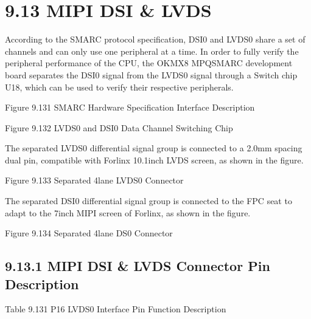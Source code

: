 \documentclass[letterpaper,10pt,openany,english]{sphinxmanual}
\begin{document}
\section{9.13 MIPI DSI \& LVDS}
\label{\detokenize{hardware:mipi-dsi-lvds}}
\sphinxAtStartPar
According to the SMARC protocol specification, DSI0 and LVDS0 share a set of channels and can only use one peripheral at a time. In order to fully verify the peripheral performance of the CPU, the OK\sphinxhyphen{}MX8 MPQ\sphinxhyphen{}SMARC development board separates the DSI0 signal from the LVDS0 signal through a Switch chip U18, which can be used to verify their respective peripherals.

\sphinxAtStartPar
{}

\sphinxAtStartPar
{}

\sphinxAtStartPar
Figure 9.13\sphinxhyphen{}1 SMARC Hardware Specification Interface Description

\sphinxAtStartPar
{}

\sphinxAtStartPar
Figure 9.13\sphinxhyphen{}2 LVDS0 and DSI0 Data Channel Switching Chip

\sphinxAtStartPar
The separated LVDS0 differential signal group is connected to a 2.0mm spacing dual pin, compatible with Forlinx 10.1\sphinxhyphen{}inch LVDS screen, as shown in the figure.

\sphinxAtStartPar
{}

\sphinxAtStartPar
Figure 9.13\sphinxhyphen{}3 Separated 4\sphinxhyphen{}lane LVDS0 Connector

\sphinxAtStartPar
The separated DSI0 differential signal group is connected to the FPC seat to adapt to the 7\sphinxhyphen{}inch MIPI screen of Forlinx, as shown in the figure.

\sphinxAtStartPar
{}

\sphinxAtStartPar
Figure 9.13\sphinxhyphen{}4 Separated 4\sphinxhyphen{}lane DS0 Connector


\subsection{9.13.1 MIPI DSI \& LVDS Connector Pin Description}
\label{\detokenize{hardware:mipi-dsi-lvds-connector-pin-description}}
\sphinxAtStartPar
Table 9.13\sphinxhyphen{}1 P16 LVDS0 Interface Pin Function Description
\end{document}
